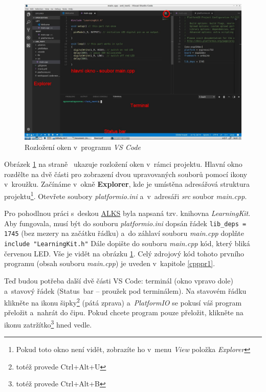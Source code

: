 \begin{figure}[h]
	\includegraphics[width=\textwidth]{soubory/rozlozeni2.jpg}
	\caption{Rozložení oken v~programu {\it VS Code}} 
	\label{fig:vsc_rozlozeni}
\end{figure}	

\hypertarget{explorer}{}
Obrázek \ref{fig:vsc_rozlozeni} na straně~\pageref{fig:vsc_rozlozeni} ukazuje rozložení oken v~rámci projektu.
Hlavní okno  rozdělte na dvě části pro zobrazení dvou upravovaných souborů pomocí ikony v~kroužku.
Začínáme v~okně {\bf Explorer}, 
 kde je umístěna adresářová struktura projektu\footnote{Pokud toto okno není vidět, zobrazíte ho v~menu {\it View} položka {\it Explorer} }.
Otevřete soubory {\it platformio.ini} a~v~adresáři {\it src} soubor {\it main.cpp}. 
 
Pro pohodlnou práci s~deskou \hyperref[alks]{ALKS} byla  napsaná tzv. knihovna {\it LearningKit}. 
Aby fungovala, musí být do souboru {\it platformio.ini} dopsán řádek {\tt lib\_deps = 1745} (bez mezery na začátku řádku) a~do záhlaví souboru {\it main.cpp} doplňte
\verb| include "LearningKit.h"|
Dále dopište do souboru {\it main.cpp} kód, který bliká červenou LED.
Vše je vidět na obrázku \ref{fig:vsc_rozlozeni}.
Celý zdrojový kód tohoto prvního programu (obsah souboru {\it main.cpp}) je uveden v~kapitole \ref{cpppr1}.
 
Teď budou potřeba další dvě části VS Code: terminál  (okno vpravo dole) a~stavový řádek (Status~bar -- proužek pod terminálem). 
Na stavovém řádku klikněte na ikonu šipky\footnote{totéž provede Ctrl+Alt+U} (pátá zprava) a~{\it PlatformIO} se pokusí váš program přeložit a~nahrát do čipu. 
Pokud chcete program pouze přeložit, klikněte na ikonu zatržítko\footnote{totéž provede Ctrl+Alt+B} hned vedle. 

